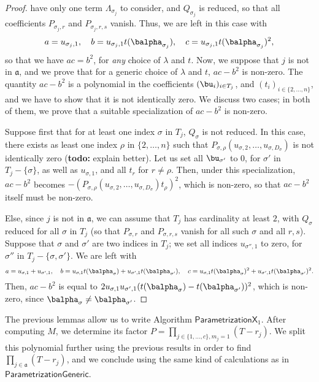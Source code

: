 \documentclass[12pt]{article}
\def\todo#1{(\textbf{todo:} #1)}
\begin{document}
\begin{proof}
have only one term $\Lambda_{\sigma_j}$ to consider, and $Q_{\sigma_j}$ 
is reduced, so that all coefficients $P_{\sigma_j,r}$ and
$P_{\sigma_j,r,s}$ vanish. Thus, we are left in
this case with
$$
a = u_{\sigma_j,1}, \quad
b = u_{\sigma_j,1} t(\balpha_{\sigma_j}), \quad
c = u_{\sigma_j,1} t(\balpha_{\sigma_j})^2,
$$ so that we have $ac=b^2$, for {\em any} choice of $\lambda$ and
$t$. Now, we suppose that $j$ is not in $\mathfrak{a}$, and we prove
that for a generic choice of $\lambda$ and $t$, $ac-b^2$ is non-zero.
The quantity $ac-b^2$ is a polynomial in the coefficients
$(\bu_i)_{i\in T_j}$, and $(t_i)_{i \in \{2,\dots,n\}}$, and we have
to show that it is not identically zero. We discuss two cases; in both
of them, we prove that a suitable specialization of $ac-b^2$ is
non-zero.

Suppose first that for at least one index $\sigma$ in $T_j$,
$Q_\sigma$ is not reduced. In this case, there exists as least one
index $\rho$ in $\{2,\dots,n\}$ such that
$P_{\sigma,\rho}(u_{\sigma,2},\dots,u_{\sigma,D_\sigma})$ is not
identically zero \todo{explain better}. Let us set all $\bu_{\sigma'}$
to $0$, for $\sigma'$ in $T_j-\{\sigma\}$, as well as $u_{\sigma,1}$,
and all $t_r$ for $r\ne \rho$. Then, under this specialization,
$ac-b^2$ becomes
$-(P_{\sigma,\rho}(u_{\sigma,2},\dots,u_{\sigma,D_\sigma})t_\rho)^2$,
which is non-zero, so that $ac-b^2$ itself must be non-zero.

Else, since $j$ is not in $\mathfrak{a}$, we can assume that $T_j$
has cardinality at least $2$, with $Q_\sigma$ reduced for all $\sigma$
in $T_j$ (so that $P_{\sigma,r}$ and $P_{\sigma,r,s}$ vanish for 
all such $\sigma$ and all $r,s$). Suppose that $\sigma$ and $\sigma'$ are two indices in
$T_j$; we set all indices $u_{\sigma'',1}$ to zero, for $\sigma''$
in $T_j-\{\sigma,\sigma'\}$. We are left with
$$
a=u_{\sigma,1}+u_{\sigma',1},\quad
b=u_{\sigma,1}t(\balpha_{\sigma})+u_{\sigma',1}t(\balpha_{\sigma'}),\quad
c=u_{\sigma,1}t(\balpha_{\sigma})^2+u_{\sigma',1}t(\balpha_{\sigma'})^2.
$$
Then, $ac-b^2$ is equal to $2u_{\sigma,1}u_{\sigma',1}(t(\balpha_{\sigma})-t(\balpha_{\sigma'}))^2$,
which is non-zero, since $\balpha_\sigma \ne \balpha_{\sigma'}$.
\end{proof}

The previous lemmas allow us to write Algorithm
$\mathsf{ParametrizationX}_1$. After computing $M$, we determine its
factor $P=\prod_{j \in \{1,\dots,c\}, m_j=1} (T-r_j)$. We split this
polynomial further using the previous results in order to find
$\prod_{j \in \mathfrak{a}} (T-r_j)$, and we conclude using the same
kind of calculations as in $\mathsf{ParametrizationGeneric}$.
\end{document}
